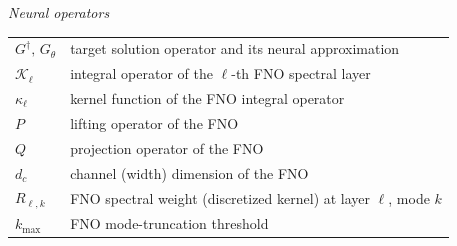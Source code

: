 \vspace{0.5cm}
\noindent\textit{Neural operators}\\[2pt]
\noindent
\begin{tabular}{@{}p{3.4cm}p{12cm}@{}}
    $G^\dagger,\,G_\theta$ & target solution operator and its neural approximation \\[2pt]
    $\mathcal{K}_{\ell}$   & integral operator of the $\ell$-th FNO spectral layer \\[2pt]
    $\kappa_{\ell}$        & kernel function of the FNO integral operator \\[2pt]
    $P$                    & lifting operator of the FNO \\[2pt]
    $Q$                    & projection operator of the FNO \\[2pt]
    $d_c$                  & channel (width) dimension of the FNO \\[2pt]
    $R_{\ell,k}$           & FNO spectral weight (discretized kernel) at layer $\ell$, mode $k$ \\[2pt]
    $k_{\max}$             & FNO mode-truncation threshold \\
\end{tabular}

\pagebreak












\printbibliography

